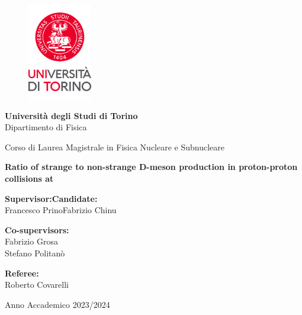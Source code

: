 \begin{center}
    \begin{figure}[h]
        \centering
        \includegraphics[width=0.25\textwidth]{logounito.png}
    \end{figure}
    \Large{{\textbf{Università degli Studi di Torino}}}\\
    \Large{Dipartimento di Fisica}
    \vspace{0.75cm}
    
    \Large{Corso di Laurea Magistrale in Fisica Nucleare e Subnucleare}\\
    \vspace{1cm}
    
    \LARGE{\textbf{Ratio of strange to non-strange D-meson production in proton-proton collisions at \boldmath\thirteen}}\\
    \vspace{1.25cm}

\end{center} 

\Large{
\noindent\textbf{Supervisor:}\hfill\textbf{Candidate:}\\
Francesco Prino\hfill Fabrizio Chinu\\
\vspace{0.5cm}

\noindent\textbf{Co-supervisors:}\\
Fabrizio Grosa\\
Stefano Politanò\\
\vspace{0.5cm}

\noindent\textbf{Referee:}\\
Roberto Covarelli\\}

\vspace{1.5cm}


\begin{center}
    \Large{Anno Accademico 2023/2024}
\end{center}

\normalsize

